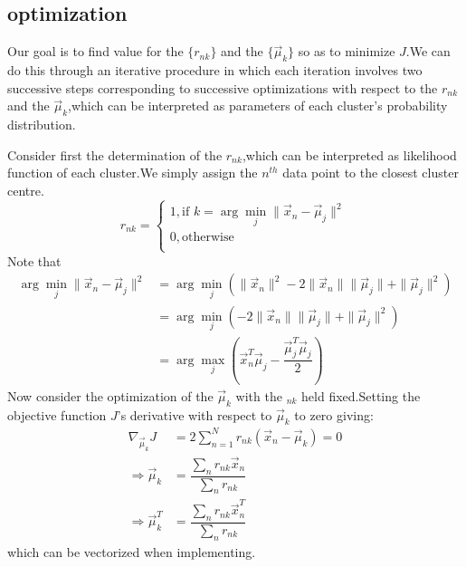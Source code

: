 \subsection{optimization}
Our goal is to find value for the $\{r_{nk}\}$ and the $\{\vec{\mu}_k\}$ so as to minimize $J$.We can do this through an iterative procedure in which each iteration involves two successive steps corresponding to successive optimizations with respect to the $r_{nk}$ and the $\vec{\mu}_k$,which can be interpreted as parameters of each cluster's probability distribution.

Consider first the determination of the $r_{nk}$,which can be interpreted as likelihood function of each cluster.We simply assign the $n^{th}$ data point to the closest cluster centre.
\begin{equation}
r_{nk} = \begin{cases}
1,\text{if }k=\arg\min_j\parallel \vec{x}_n-\vec{\mu}_j\parallel^2 \\
0,\text{otherwise} \\
\end{cases}
\end{equation}
Note that
\begin{align}
\arg\min_j\parallel \vec{x}_n-\vec{\mu}_j\parallel^2
&= \arg\min_j(\parallel \vec{x}_n\parallel ^2-2\parallel \vec{x}_n\parallel\parallel \vec{\mu}_j\parallel + \parallel\vec{\mu}_j\parallel^2)  \\
&=\arg\min_j(-2\parallel \vec{x}_n\parallel\parallel \vec{\mu}_j\parallel + \parallel\vec{\mu}_j\parallel^2)   \\
&=\arg\max_j(\vec{x}_n^T\vec{\mu}_j-\dfrac{\vec{\mu}_j^T\vec{\mu}_j}{2})
\end{align}
Now consider the optimization of the $\vec{\mu}_k$ with the $_{nk}$ held fixed.Setting the objective function $J$'s derivative with respect to $\vec{\mu}_k$ to zero giving:
\begin{align}
	\nabla_{\vec{\mu}_k} J
	&=2\sum_{n=1}^{N}r_{nk}(\vec{x}_n-\vec{\mu}_k)=0 \\
	\Rightarrow 
	\vec{\mu}_k &=\dfrac{\sum_n{r_{nk}\vec{x}_n}}{\sum_n{r_{nk}}} \\
	\Rightarrow
	\vec{\mu}_k^T &= \dfrac{\sum_n{r_{nk}\vec{x}_n^T}}{\sum_n{r_{nk}}}
\end{align}
which can be vectorized when implementing.


